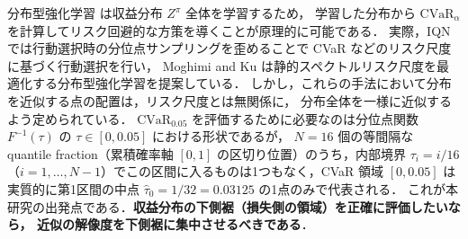 \documentclass[a4paper,10pt]{jsarticle}
\theoremstyle{definition}
\newcommand{\CVaR}{\mathrm{CVaR}}
\renewcommand{\Finv}{F^{-1}}
\begin{document}
分布型強化学習 \cite{bellemare2017c51,dabney2018qrdqn,dabney2018iqn,yang2019fqf} は収益分布 $Z^\pi$ 全体を学習するため，
学習した分布から $\CVaR_\alpha$ を計算してリスク回避的な方策を導くことが原理的に可能である．
実際，IQN \cite{dabney2018iqn} では行動選択時の分位点サンプリングを歪めることで CVaR などのリスク尺度に基づく行動選択を行い，
Moghimi and Ku \cite{moghimi2025beyond} は静的スペクトルリスク尺度を最適化する分布型強化学習を提案している．
しかし，これらの手法において分布を近似する点の配置は，リスク尺度とは無関係に，
分布全体を一様に近似するよう定められている．
$\CVaR_{0.05}$ を評価するために必要なのは分位点関数 $\Finv(\tau)$ の $\tau\in[0,0.05]$ における形状であるが，
$N=16$ 個の等間隔な quantile fraction（累積確率軸 $[0,1]$ の区切り位置）のうち，内部境界 $\tau_i=i/16$（$i=1,\dots,N-1$）でこの区間に入るものは1つもなく，CVaR 領域 $[0, 0.05]$ は実質的に第1区間の中点 $\hat\tau_0=1/32=0.03125$ の1点のみで代表される．
これが本研究の出発点である．\textbf{収益分布の下側裾（損失側の領域）を正確に評価したいなら，
近似の解像度を下側裾に集中させるべきである}．
\end{document}

